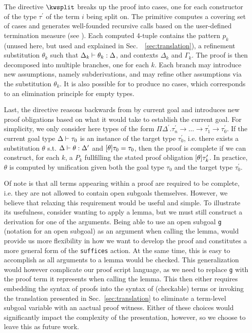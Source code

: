 The directive
$\kwsplit$ breaks up the proof into cases, one for each
constructor of the type $\tau^\prime$ of the term $i$ being split on.
The \scov{} primitive computes a covering set of
cases and generates well-founded recursive calls based on the
user-defined termination measure (see \cite{Pientka:TLCA15}).
Each computed 4-tuple contains the pattern $p_k$ (unused here, but used and
explained in Sec.~~\ref{sec:translation}), a refinement substitution $\theta_k$
such that $\Delta_k \vdash \theta_k : \Delta$, and contexts $\Delta_k$ and
$\Gamma_k$.
The proof is then decomposed into multiple branches, one for each $k$.
Each branch may introduce new assumptions, namely subderivations, and may refine
other assumptions via the substitution $\theta_k$.
It is also possible for \kwsplit{} to produce no cases, which corresponds to an
elimination principle for empty types.

Last, the \kwsuffices{} directive reasons backwards from by
current goal and introduces new proof obligations based on what it
would take to establish the current goal.
For simplicity, we only consider here types of the form
$\Pi \Delta^\prime.\tau_n^\prime \to \ldots \to \tau_1^\prime \to \tau_0^\prime$.
If the current goal type $\Delta \vdash \tau_0$ is an instance of the target type
$\tau_0^\prime$, i.e. there exists a substitution $\theta$
s.t. $\Delta \vdash \theta : \Delta^\prime$ and $[\theta]\tau_0
= \tau_0$, then the proof is complete if we can construct, for each $k$, a $P_k$
fullfilling the stated proof obligation $[\theta]\tau^\prime_k$. In practice, $\theta$ is
computed by unification given both the goal type $\tau_0$ and the
target type $\tau_0^\prime$.

Of note is that all \Beluga{} terms appearing within a \Harpoon{} proof are
required to be complete, i.e. they are not allowed to contain open subgoals
themselves. However, we believe that relaxing this requirement would
be useful and simple. To illustrate its usefulness, consider wanting
to apply a lemma, but we must still construct a derivation for one of
the arguments. Being able to use an open subgoal \lstinline!g! (notation for an open
subgoal) as an argument when calling the lemma, would provide us more
flexibility in how we want to develop the proof and constitutes a more
general form of the \lstinline!suffices! action. At the same time,
this is easy to accomplish as all arguments to a lemma would be
checked. This generalization would however complicate our proof script
language, as we need to replace \lstinline!g! with the proof term it
represents when calling the lemma. This then either requires embedding the syntax
of proofs into the syntax of (checkable) terms or invoking the translation
presented in Sec.~\ref{sec:translation} to eliminate a term-level
subgoal variable with an aactual \Harpoon{} proof witness.
Either of these choices would significantly impact the complexity of the
presentation, however, so we choose to leave this as future work.

